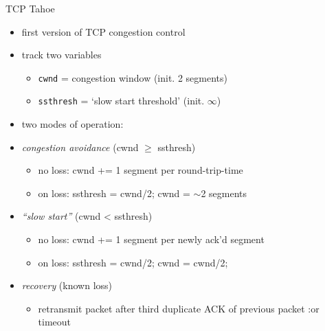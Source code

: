 \begin{frame}{TCP Tahoe}
    \begin{itemize}
    \item first version of TCP congestion control
    \item track two variables
        \begin{itemize}
        \item \texttt{cwnd} = congestion window (init. 2 segments)
        \item \texttt{ssthresh} = `slow start threshold' (init. $\infty$)
        \end{itemize}
    \item two modes of operation:
    \item \textit{congestion avoidance} (cwnd $\ge$ ssthresh)
        \begin{itemize}
        \item no loss: cwnd += 1 segment per round-trip-time
        \item on loss: ssthresh = cwnd/2; cwnd = $\sim$2 segments
        \end{itemize}
    \item \textit{``slow start''} (cwnd < ssthresh)
        \begin{itemize}
        \item no loss: cwnd += 1 segment per newly ack'd segment
        \item on loss: ssthresh = cwnd/2; cwnd = cwnd/2;
        \end{itemize}
    \item \textit{recovery} (known loss)
        \begin{itemize}
        \item retransmit packet after third duplicate ACK of previous packet :or timeout
        \end{itemize}
    \end{itemize}
\end{frame}
